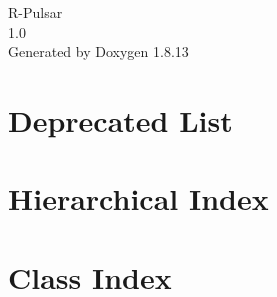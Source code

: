 \documentclass[twoside]{book}
\newcommand{\+}{\discretionary{\mbox{\scriptsize$\hookleftarrow$}}{}{}}
\newcommand{\clearemptydoublepage}{%
  \newpage{\pagestyle{empty}\cleardoublepage}%
}
\begin{document}
\hypersetup{pageanchor=false,
             bookmarksnumbered=true,
             pdfencoding=unicode
            }
\begin{titlepage}
\vspace*{7cm}
\begin{center}%
{\Large R-\/\+Pulsar \\[1ex]\large 1.\+0 }\\
\vspace*{1cm}
{\large Generated by Doxygen 1.8.13}\\
\end{center}
\end{titlepage}
\clearemptydoublepage
{}
\tableofcontents
\clearemptydoublepage
{}
\hypersetup{pageanchor=true}

\chapter{Deprecated List}
\label{deprecated}

\chapter{Hierarchical Index}

\chapter{Class Index}

\end{document}
